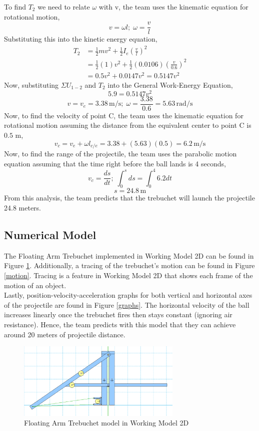 \documentclass[12pt, titlepage]{article}
\begin{document}
    To find $T_2$ we need to relate $\omega$ with v, the team uses the kinematic equation for rotational motion,
    $$v = \omega l;\; \omega = \frac{v}{l}$$
    Substituting this into the kinetic energy equation,
    \begin{align*}
        T_2 &= \frac{1}{2}mv^2 + \frac{1}{2}I_e\left(\frac{v}{l}\right)^2 \\
        &= \frac{1}{2}(1)v^2 + \frac{1}{2}(0.0106)\left(\frac{v}{0.6}\right)^2 \\
        &= 0.5v^2 + 0.0147v^2 = 0.5147v^2
    \end{align*}
    Now, substituting $\Sigma U_{1-2}$ and $T_2$ into the General Work-Energy Equation,
    $$5.9 = 0.5147v^2$$
    $$v = v_e = 3.38 \, \mathrm{m/s};\; \omega = \frac{3.38}{0.6} = 5.63 \, \mathrm{rad/s}$$
    Now, to find the velocity of point C, the team uses the kinematic equation for rotational motion assuming the distance from the equivalent center to point C is $0.5$ m,
    $$v_c = v_e + \omega l_{c/e} = 3.38 + (5.63)(0.5) = 6.2 \, \mathrm{m/s}$$
    Now, to find the range of the projectile, the team uses the parabolic motion equation assuming that the time right before the ball lands is 4 seconds,
    $$v_c = \frac{ds}{dt};\; \displaystyle\int_{0}^{s}ds = \displaystyle\int_{0}^{4}6.2dt$$
    \[ \boxed{s = 24.8 \, \mathrm{m}} \]
    From this analysis, the team predicts that the trebuchet will launch the projectile 24.8 meters.
    \newpage
    \subsection{Numerical Model}
    The Floating Arm Trebuchet implemented in Working Model 2D can be found 
    in Figure \ref{model}. Additionally, a tracing of the trebuchet's motion 
    can be found in Figure \ref{motion}. Tracing is a feature in Working 
    Model 2D that shows each frame of the motion of an object.\\[10pt]
    Lastly, position-velocity-acceleration graphs for both vertical and 
    horizontal axes of the projectile are found in Figure \ref{graphs}.
    The horizontal velocity of the ball increases linearly once the trebuchet fires
    then stays constant (ignoring air resistance). Hence, the team predicts 
    with this model that they can achieve around 20 meters of projectile
    distance.

    \begin{figure}[t]                                  
    \centering
    \includegraphics[width=0.7\textwidth]{figures/Model.png}
    \caption{Floating Arm Trebuchet model in Working Model 2D\label{model}}
    \end{figure}
\end{document}

